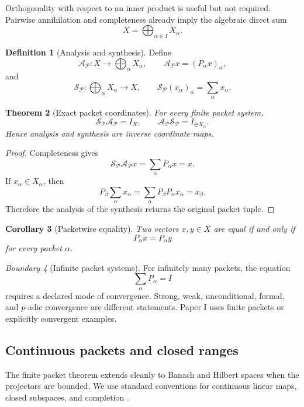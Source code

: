 \documentclass[11pt]{article}
\newtheorem{theorem}{Theorem}[section]
\newtheorem{corollary}[theorem]{Corollary}
\theoremstyle{definition}
\newtheorem{definition}[theorem]{Definition}
\theoremstyle{remark}
\newtheorem{boundary}[theorem]{Boundary}
\newcommand{\cP}{\mathcal P}
\begin{document}
Orthogonality with respect to an inner product is useful but not required. Pairwise annihilation and completeness already imply the algebraic direct sum
\[
X=\bigoplus_{\alpha\in I}X_{\alpha}.
\]

\begin{definition}[Analysis and synthesis]
Define
\[
\mathcal A_{\cP}:X\longrightarrow\bigoplus_{\alpha}X_{\alpha},
\qquad
\mathcal A_{\cP}x=(P_{\alpha}x)_{\alpha},
\]
and
\[
\mathcal S_{\cP}:\bigoplus_{\alpha}X_{\alpha}\longrightarrow X,
\qquad
\mathcal S_{\cP}(x_{\alpha})_{\alpha}=\sum_{\alpha}x_{\alpha}.
\]
\end{definition}

\begin{theorem}[Exact packet coordinates]
\label{thm:analysis-synthesis}
For every finite packet system,
\[
{
\mathcal S_{\cP}\mathcal A_{\cP}=I_X,
\qquad
\mathcal A_{\cP}\mathcal S_{\cP}=I_{\oplus X_{\alpha}}.
}
\]
Hence analysis and synthesis are inverse coordinate maps.
\end{theorem}

\begin{proof}
Completeness gives
\[
\mathcal S_{\cP}\mathcal A_{\cP}x
=
\sum_{\alpha}P_{\alpha}x=x.
\]
If $x_{\alpha}\in X_{\alpha}$, then
\[
P_{\beta}\sum_{\alpha}x_{\alpha}
=
\sum_{\alpha}P_{\beta}P_{\alpha}x_{\alpha}
=x_{\beta}.
\]
Therefore the analysis of the synthesis returns the original packet tuple.
\end{proof}

\begin{corollary}[Packetwise equality]
\label{cor:packetwise-equality}
Two vectors $x,y\in X$ are equal if and only if
\[
P_{\alpha}x=P_{\alpha}y
\]
for every packet $\alpha$.
\end{corollary}

\begin{boundary}[Infinite packet systems]
For infinitely many packets, the equation
\[
\sum_{\alpha}P_{\alpha}=I
\]
requires a declared mode of convergence. Strong, weak, unconditional, formal, and $p$-adic convergence are different statements. Paper I uses finite packets or explicitly convergent examples.
\end{boundary}

\subsection{Continuous packets and closed ranges}

The finite packet theorem extends cleanly to Banach and Hilbert spaces when the projectors are bounded. We use standard conventions for continuous linear maps, closed subspaces, and completion \cite{schaeferWolff1999}\cite{conway1990}.
\end{document}
